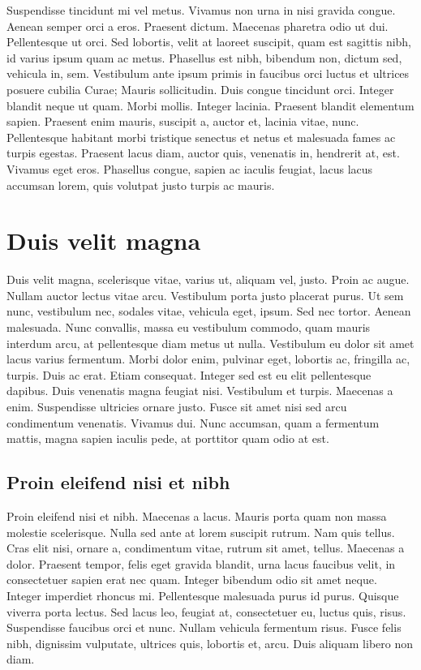 \documentclass[../hdr.tex]{subfiles}
\begin{document}
Suspendisse tincidunt mi vel metus. Vivamus non urna in nisi gravida congue.
Aenean semper orci a eros. Praesent dictum. Maecenas pharetra odio ut dui.
Pellentesque ut orci. Sed lobortis, velit at laoreet suscipit, quam est sagittis
nibh, id varius ipsum quam ac metus. Phasellus est nibh, bibendum non, dictum
sed, vehicula in, sem. Vestibulum ante ipsum primis in faucibus orci luctus et
ultrices posuere cubilia Curae; Mauris sollicitudin. Duis congue tincidunt orci.
Integer blandit neque ut quam. Morbi mollis. Integer lacinia. Praesent blandit
elementum sapien. Praesent enim mauris, suscipit a, auctor et, lacinia vitae,
nunc. Pellentesque habitant morbi tristique senectus et netus et malesuada fames
ac turpis egestas. Praesent lacus diam, auctor quis, venenatis in, hendrerit at,
est. Vivamus eget eros. Phasellus congue, sapien ac iaculis feugiat, lacus lacus
accumsan lorem, quis volutpat justo turpis ac mauris.

\section{Duis velit magna}

Duis velit magna, scelerisque vitae, varius ut, aliquam vel, justo. Proin ac
augue. Nullam auctor lectus vitae arcu. Vestibulum porta justo placerat purus.
Ut sem nunc, vestibulum nec, sodales vitae, vehicula eget, ipsum. Sed nec
tortor. Aenean malesuada. Nunc convallis, massa eu vestibulum commodo, quam
mauris interdum arcu, at pellentesque diam metus ut nulla. Vestibulum eu dolor
sit amet lacus varius fermentum. Morbi dolor enim, pulvinar eget, lobortis ac,
fringilla ac, turpis. Duis ac erat. Etiam consequat. Integer sed est eu elit
pellentesque dapibus. Duis venenatis magna feugiat nisi. Vestibulum et turpis.
Maecenas a enim. Suspendisse ultricies ornare justo. Fusce sit amet nisi sed
arcu condimentum venenatis. Vivamus dui. Nunc accumsan, quam a fermentum mattis,
magna sapien iaculis pede, at porttitor quam odio at est.

\subsection{Proin eleifend nisi et nibh}

Proin eleifend nisi et nibh. Maecenas a lacus. Mauris porta quam non massa
molestie scelerisque. Nulla sed ante at lorem suscipit rutrum. Nam quis tellus.
Cras elit nisi, ornare a, condimentum vitae, rutrum sit amet, tellus. Maecenas a
dolor. Praesent tempor, felis eget gravida blandit, urna lacus faucibus velit,
in consectetuer sapien erat nec quam. Integer bibendum odio sit amet neque.
Integer imperdiet rhoncus mi. Pellentesque malesuada purus id purus. Quisque
viverra porta lectus. Sed lacus leo, feugiat at, consectetuer eu, luctus quis,
risus. Suspendisse faucibus orci et nunc. Nullam vehicula fermentum risus. Fusce
felis nibh, dignissim vulputate, ultrices quis, lobortis et, arcu. Duis aliquam
libero non diam.
\end{document}
